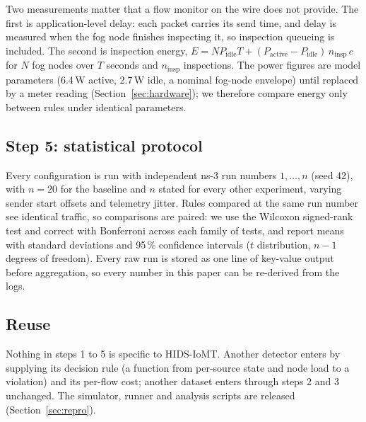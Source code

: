 Two measurements matter that a flow monitor on the wire does not provide. The first is application-level delay: each packet carries its send time, and delay is measured when the fog node finishes inspecting it, so inspection queueing is included. The second is inspection energy, $E = N P_{\mathrm{idle}} T + (P_{\mathrm{active}} - P_{\mathrm{idle}})\, n_{\mathrm{insp}}\, c$ for $N$ fog nodes over $T$ seconds and $n_{\mathrm{insp}}$ inspections. The power figures are model parameters (6.4\,W active, 2.7\,W idle, a nominal fog-node envelope) until replaced by a meter reading (Section~\ref{sec:hardware}); we therefore compare energy only between rules under identical parameters.

\subsection{Step 5: statistical protocol}
\noindent Every configuration is run with independent ns-3 run numbers $1, \dots, n$ (seed 42), with $n = 20$ for the baseline and $n$ stated for every other experiment, varying sender start offsets and telemetry jitter. Rules compared at the same run number see identical traffic, so comparisons are paired: we use the Wilcoxon signed-rank test and correct with Bonferroni across each family of tests, and report means with standard deviations and 95\,\% confidence intervals ($t$ distribution, $n-1$ degrees of freedom). Every raw run is stored as one line of key-value output before aggregation, so every number in this paper can be re-derived from the logs.

\subsection{Reuse}
\noindent Nothing in steps 1 to 5 is specific to HIDS-IoMT. Another detector enters by supplying its decision rule (a function from per-source state and node load to a violation) and its per-flow cost; another dataset enters through steps 2 and 3 unchanged. The simulator, runner and analysis scripts are released (Section~\ref{sec:repro}).
